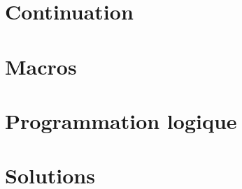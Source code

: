 \documentclass{scrreprt}
\begin{document}


\chapter{Continuation}


\chapter{Macros}














\chapter{Programmation logique}














\chapter{Solutions}
\shipoutAnswer
\end{document}

